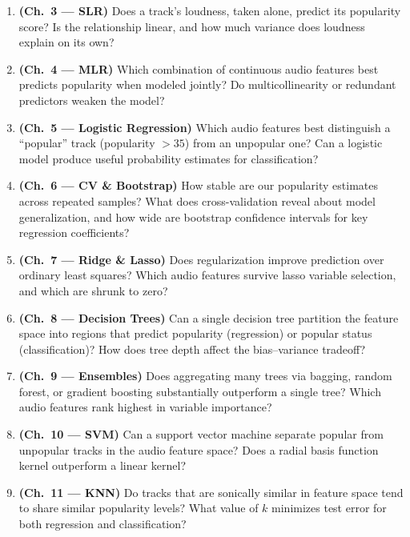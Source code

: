\documentclass[12pt, oneside]{book}
\begin{document}
\begin{enumerate}[leftmargin=*, label=\textbf{Q\arabic*.}]
    \item \textbf{(Ch.\ 3 — SLR)} Does a track's loudness, taken alone, predict its popularity score? Is the relationship linear, and how much variance does loudness explain on its own?

    \item \textbf{(Ch.\ 4 — MLR)} Which combination of continuous audio features best predicts popularity when modeled jointly? Do multicollinearity or redundant predictors weaken the model?

    \item \textbf{(Ch.\ 5 — Logistic Regression)} Which audio features best distinguish a ``popular'' track (popularity $> 35$) from an unpopular one? Can a logistic model produce useful probability estimates for classification?

    \item \textbf{(Ch.\ 6 — CV \& Bootstrap)} How stable are our popularity estimates across repeated samples? What does cross-validation reveal about model generalization, and how wide are bootstrap confidence intervals for key regression coefficients?

    \item \textbf{(Ch.\ 7 — Ridge \& Lasso)} Does regularization improve prediction over ordinary least squares? Which audio features survive lasso variable selection, and which are shrunk to zero?

    \item \textbf{(Ch.\ 8 — Decision Trees)} Can a single decision tree partition the feature space into regions that predict popularity (regression) or popular status (classification)? How does tree depth affect the bias--variance tradeoff?

    \item \textbf{(Ch.\ 9 — Ensembles)} Does aggregating many trees via bagging, random forest, or gradient boosting substantially outperform a single tree? Which audio features rank highest in variable importance?

    \item \textbf{(Ch.\ 10 — SVM)} Can a support vector machine separate popular from unpopular tracks in the audio feature space? Does a radial basis function kernel outperform a linear kernel?

    \item \textbf{(Ch.\ 11 — KNN)} Do tracks that are sonically similar in feature space tend to share similar popularity levels? What value of $k$ minimizes test error for both regression and classification?


\end{enumerate}
\end{document}
